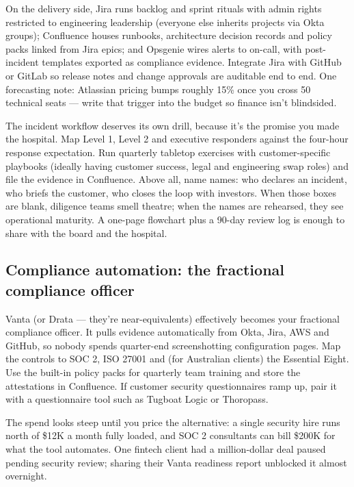 On the delivery side, Jira runs backlog and sprint rituals with admin rights restricted to engineering leadership (everyone else inherits projects via Okta groups); Confluence houses runbooks, architecture decision records and policy packs linked from Jira epics; and Opsgenie wires alerts to on-call, with post-incident templates exported as compliance evidence. Integrate Jira with GitHub or GitLab so release notes and change approvals are auditable end to end. One forecasting note: Atlassian pricing bumps roughly 15\% once you cross 50 technical seats — write that trigger into the budget so finance isn't blindsided.


The incident workflow deserves its own drill, because it's the promise you made the hospital. Map Level 1, Level 2 and executive responders against the four-hour response expectation. Run quarterly tabletop exercises with customer-specific playbooks (ideally having customer success, legal and engineering swap roles) and file the evidence in Confluence. Above all, name names: who declares an incident, who briefs the customer, who closes the loop with investors. When those boxes are blank, diligence teams smell theatre; when the names are rehearsed, they see operational maturity. A one-page flowchart plus a 90-day review log is enough to share with the board and the hospital.



\subsection{Compliance automation: the fractional compliance officer}


Vanta (or Drata — they're near-equivalents) effectively becomes your fractional compliance officer. It pulls evidence automatically from Okta, Jira, AWS and GitHub, so nobody spends quarter-end screenshotting configuration pages. Map the controls to SOC 2, ISO 27001 and (for Australian clients) the Essential Eight. Use the built-in policy packs for quarterly team training and store the attestations in Confluence. If customer security questionnaires ramp up, pair it with a questionnaire tool such as Tugboat Logic or Thoropass.


The spend looks steep until you price the alternative: a single security hire runs north of \$12K a month fully loaded, and SOC 2 consultants can bill \$200K for what the tool automates. One fintech client had a million-dollar deal paused pending security review; sharing their Vanta readiness report unblocked it almost overnight.



